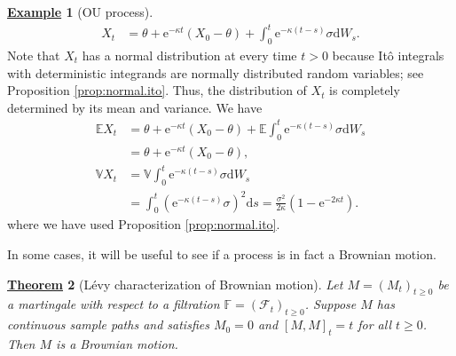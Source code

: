 \documentclass[12pt]{book}
\numberwithin{equation}{chapter}
\theoremstyle{plain}
\newtheorem{theorem}{\underline{Theorem}}
\numberwithin{theorem}{section}
\theoremstyle{definition}
\newtheorem{example}[theorem]{\underline{Example}}
\numberwithin{exercise}{chapter}
\newcommand{\<}{\langle}
\renewcommand{\>}{\rangle}
\renewcommand{\(}{\left(}
\renewcommand{\)}{\right)}
\renewcommand{\[}{\left[}
\renewcommand{\]}{\right]}
\newcommand\Eb{\mathds{E}}
\newcommand\Fb{\mathds{F}}
\newcommand\Vb{\mathds{V}}
\newcommand\Fc{\mathscr{F}}
\newcommand\sig{\sigma}
\newcommand\dd{\mathrm{d}}
\newcommand\ee{\mathrm{e}}
\begin{document}
\begin{example}[OU process]
\begin{align}
X_t
	&=	\theta + \ee^{- \kappa t} ( X_0 - \theta ) + \int_0^t \ee^{-\kappa(t-s)} \sig \dd W_s .
\end{align}
Note that $X_t$ has a normal distribution at every time $t>0$ because It\^o integrals with deterministic integrands are normally distributed random variables; see Proposition \ref{prop:normal.ito}.  Thus, the distribution of $X_t$ is completely determined by its mean and variance.  We have
\begin{align}
\Eb X_t
	&=	\theta + \ee^{- \kappa t} ( X_0 - \theta ) + \Eb \int_0^t \ee^{-\kappa(t-s)} \sig \dd W_s \\
	&=	\theta + \ee^{- \kappa t} ( X_0 - \theta ) , \\
\Vb X_t
	&=	\Vb \int_0^t \ee^{-\kappa(t-s)} \sig \dd W_s \\
	&=	\int_0^t \( \ee^{-\kappa(t-s)} \sig \)^2 \dd s
	=		\frac{\sig^2}{2 \kappa} \( 1 - \ee^{-2 \kappa t} \) .
\end{align}
where we have used Proposition \ref{prop:normal.ito}.
\end{example}

\noindent
In some cases, it will be useful to see if a process is in fact a Brownian motion.

\begin{theorem}[L\'evy characterization of Brownian motion]
\label{thm:Levy}
Let $M = (M_t)_{t \geq 0}$ be a martingale with respect to a filtration $\Fb=(\Fc_t)_{t \geq 0}$.  Suppose $M$ has continuous sample paths and satisfies $M_0 = 0$ and $[M,M]_t = t$ for all $t \geq 0$.  Then $M$ is a Brownian motion.
\end{theorem}
\end{document}
